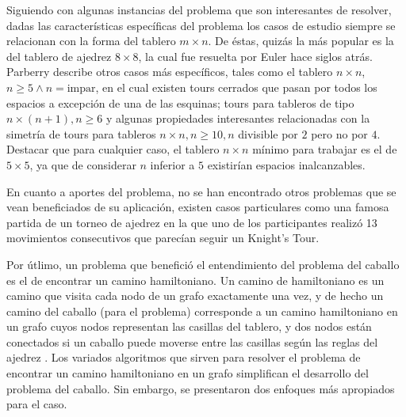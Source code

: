 \documentclass[journal, 10pt]{IEEEtran}
\begin{document}
Siguiendo con algunas instancias del problema que son interesantes de resolver, dadas las características específicas del problema los casos de estudio siempre se relacionan con la forma del tablero $m \times n$. De éstas, quizás la más popular es la del tablero de ajedrez $8 \times 8$, la cual fue resuelta por Euler \cite{Euler:1759} hace siglos atrás. Parberry \cite{Parberry:1997} describe otros casos más específicos, tales como el tablero $n \times n$, $n \ge 5 \wedge n=\text{impar}$, en el cual existen tours cerrados que pasan por todos los espacios a excepción de una de las esquinas; tours para tableros de tipo $n \times (n+1), n \ge 6$ y algunas propiedades interesantes relacionadas con la simetría de tours para tableros $n \times n, n \ge 10, n$ divisible por $2$ pero no por $4$. Destacar que para cualquier caso, el tablero $n \times n$ mínimo para trabajar es el de $5\times 5$, ya que de considerar $n$ inferior a $5$ existirían espacios inalcanzables.

En cuanto a aportes del problema, no se han encontrado otros problemas que se vean beneficiados de su aplicación, existen casos particulares como una famosa partida de un torneo de ajedrez en la que uno de los participantes realizó 13 movimientos consecutivos que parecían seguir un Knight's Tour\cite{Shabazz:2010}.

Por útlimo, un problema que benefició el entendimiento del problema del caballo es el de encontrar un camino hamiltoniano. Un camino de hamiltoniano es un camino que visita cada nodo de un grafo exactamente una vez, y de hecho un camino del caballo (para el problema) corresponde a un camino hamiltoniano en un grafo cuyos nodos representan las casillas  del tablero, y dos nodos est\'an conectados si un caballo puede moverse entre las casillas seg\'un las reglas del ajedrez \cite{Rosen/2002}. Los variados algoritmos que sirven para resolver el problema de encontrar un camino hamiltoniano en un grafo simplifican el desarrollo del problema del caballo. Sin embargo, se presentaron dos enfoques más apropiados para el caso.

\end{document}
